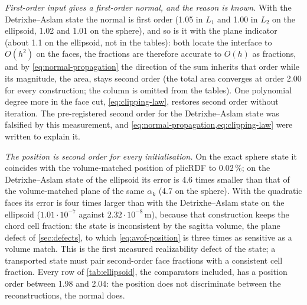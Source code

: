 \documentclass[preprint,12pt]{elsarticle}
\begin{document}
\emph{First-order input gives a first-order normal, and the reason is known.} With the Detrixhe--Aslam state the normal is first order (1.05 in $L_1$ and 1.00 in $L_2$ on the ellipsoid, 1.02 and 1.01 on the sphere), and so is it with the plane indicator (about 1.1 on the ellipsoid, not in the tables): both locate the interface to $O(h^2)$ on the faces, the fractions are therefore accurate to $O(h)$ as fractions, and by \cref{eq:normal-propagation} the direction of the sum inherits that order while its magnitude, the area, stays second order (the total area converges at order 2.00 for every construction; the column is omitted from the tables). One polynomial degree more in the face cut, \cref{eq:clipping-law}, restores second order without iteration. The pre-registered second order for the Detrixhe--Aslam state was falsified by this measurement, and \cref{eq:normal-propagation,eq:clipping-law} were written to explain it.

\emph{The position is second order for every initialisation.} On the exact sphere state it coincides with the volume-matched position of plicRDF to $0.02\,\%$; on the Detrixhe--Aslam state of the ellipsoid its error is 4.6 times smaller than that of the volume-matched plane of the same $\alpha_k$ (4.7 on the sphere). With the quadratic faces its error is four times larger than with the Detrixhe--Aslam state on the ellipsoid ($1.01\cdot10^{-7}$ against $2.32\cdot10^{-8}\,\mathrm{m}$), because that construction keeps the chord cell fraction: the state is inconsistent by the sagitta volume, the plane defect of \cref{sec:defects}, to which \cref{eq:avof-position} is three times as sensitive as a volume match. This is the first measured realizability defect of the state; a transported state must pair second-order face fractions with a consistent cell fraction. Every row of \cref{tab:ellipsoid}, the comparators included, has a position order between 1.98 and 2.04: the position does not discriminate between the reconstructions, the normal does.
\end{document}
